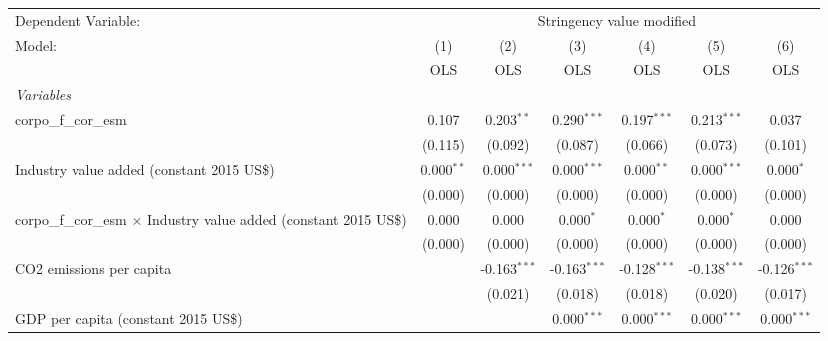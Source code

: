 
\begingroup
\centering
\begin{tabular}{lcccccc}
   \toprule
   Dependent Variable: & \multicolumn{6}{c}{Stringency value modified}\\
   Model:                                                                     & (1)          & (2)            & (3)            & (4)            & (5)            & (6)\\  
                                                                              &  OLS         & OLS            & OLS            & OLS            & OLS            & OLS\\  
   \midrule
   \emph{Variables}\\
   corpo\_f\_cor\_esm                                                         & 0.107        & 0.203$^{**}$   & 0.290$^{***}$  & 0.197$^{***}$  & 0.213$^{***}$  & 0.037\\   
                                                                              & (0.115)      & (0.092)        & (0.087)        & (0.066)        & (0.073)        & (0.101)\\   
   Industry value added (constant 2015 US\$)                                  & 0.000$^{**}$ & 0.000$^{***}$  & 0.000$^{***}$  & 0.000$^{**}$   & 0.000$^{***}$  & 0.000$^{*}$\\   
                                                                              & (0.000)      & (0.000)        & (0.000)        & (0.000)        & (0.000)        & (0.000)\\   
   corpo\_f\_cor\_esm $\times$ Industry value added (constant 2015 US\$)      & 0.000        & 0.000          & 0.000$^{*}$    & 0.000$^{*}$    & 0.000$^{*}$    & 0.000\\   
                                                                              & (0.000)      & (0.000)        & (0.000)        & (0.000)        & (0.000)        & (0.000)\\   
   CO2 emissions per capita                                                   &              & -0.163$^{***}$ & -0.163$^{***}$ & -0.128$^{***}$ & -0.138$^{***}$ & -0.126$^{***}$\\   
                                                                              &              & (0.021)        & (0.018)        & (0.018)        & (0.020)        & (0.017)\\   
   GDP per capita (constant 2015 US\$)                                        &              &                & 0.000$^{***}$  & 0.000$^{***}$  & 0.000$^{***}$  & 0.000$^{***}$\\   

\end{tabular}
